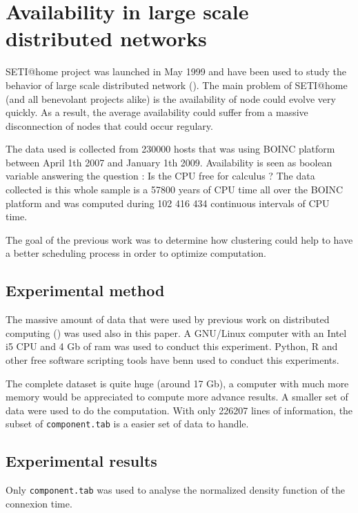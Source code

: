 \section{Availability in large scale distributed networks}

SETI@home project was launched in May 1999 and have been used to study the behavior of
large scale distributed network (\cite{ja_ko_mascots09}). The main problem of SETI@home
(and all benevolant projects alike) is the availability of node could evolve very quickly.
As a result, the average availability could suffer from a massive disconnection of nodes that could
occur regulary.

The data used is collected from 230000 hosts that was using BOINC platform between April 1th 2007 and 
January 1th 2009. Availability is seen as boolean variable answering the question : Is the CPU free 
for calculus ? The data collected is this whole sample is a 57800 years of CPU time all over the BOINC
platform and was computed during 102 416 434 continuous intervals of CPU time.

The goal of the previous work \cite{ja_ko_mascots09} was to determine how clustering could help
to have a better scheduling process in order to optimize computation.

\subsection{Experimental method}

The massive amount of data that were used by previous work on distributed computing (\cite{ja_ko_mascots09})
was used also in this paper. A GNU/Linux computer with an Intel i5 CPU and 4 Gb of ram was used to conduct this
experiment. Python, R and other free software scripting tools have benn used to conduct this experiments.

The complete dataset is quite huge (around 17 Gb), a computer with much more memory would be appreciated to
compute more advance results. A smaller set of data were used to do the computation. With only 226207 lines
of information, the subset of \texttt{component.tab} is a easier set of data to handle.

\subsection{Experimental results}

Only \texttt{component.tab} was used to analyse the normalized density function of the connexion time.

